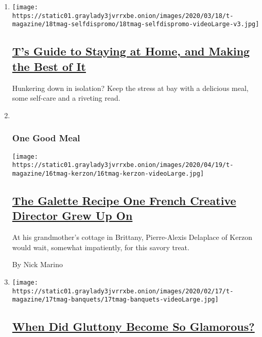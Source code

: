 \begin{enumerate}
\def\labelenumi{\arabic{enumi}.}
\item
  \texttt{[image: https://static01.graylady3jvrrxbe.onion/images/2020/03/18/t-magazine/18tmag-selfdispromo/18tmag-selfdispromo-videoLarge-v3.jpg]}

  \hypertarget{ts-guide-to-staying-at-home-and-making-the-best-of-it}{%
  \subsection{\texorpdfstring{\href{/2020/03/19/t-magazine/stay-at-home-coronavirus-ideas.html}{T's
  Guide to Staying at Home, and Making the Best of
  It}}{T's Guide to Staying at Home, and Making the Best of It}}\label{ts-guide-to-staying-at-home-and-making-the-best-of-it}}

  Hunkering down in isolation? Keep the stress at bay with a delicious
  meal, some self-care and a riveting read.
\item ~
  \hypertarget{one-good-meal-4}{%
  \subsubsection{One Good Meal}\label{one-good-meal-4}}

  \texttt{[image: https://static01.graylady3jvrrxbe.onion/images/2020/04/19/t-magazine/16tmag-kerzon/16tmag-kerzon-videoLarge.jpg]}

  \hypertarget{the-galette-recipe-one-french-creative-director-grew-up-on}{%
  \subsection{\texorpdfstring{\href{/2020/04/16/t-magazine/galette-recipe-pierre-alexis-delaplace.html}{The
  Galette Recipe One French Creative Director Grew Up
  On}}{The Galette Recipe One French Creative Director Grew Up On}}\label{the-galette-recipe-one-french-creative-director-grew-up-on}}

  At his grandmother's cottage in Brittany, Pierre-Alexis Delaplace of
  Kerzon would wait, somewhat impatiently, for this savory treat.

  By Nick Marino
\item
  \texttt{[image: https://static01.graylady3jvrrxbe.onion/images/2020/02/17/t-magazine/17tmag-banquets/17tmag-banquets-videoLarge.jpg]}

  \hypertarget{when-did-gluttony-become-so-glamorous}{%
  \subsection{\texorpdfstring{\href{/2020/02/21/t-magazine/fashion-banquets.html}{When
  Did Gluttony Become So
  Glamorous?}}{When Did Gluttony Become So Glamorous?}}\label{when-did-gluttony-become-so-glamorous}}


\end{enumerate}
